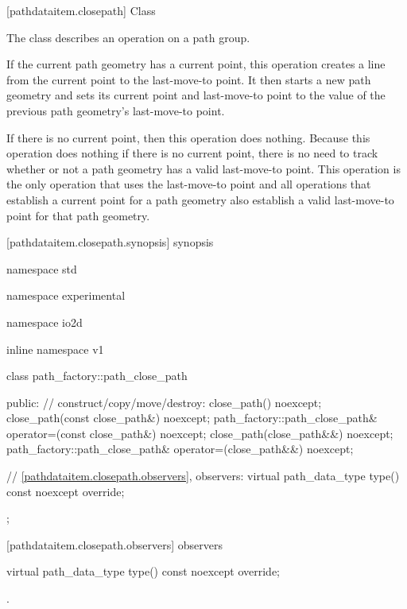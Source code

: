  [pathdataitem.closepath] {Class }

\pnum
{}
The class  describes an operation on a path group.

\pnum
If the current path geometry has a current point, this operation creates a line from the current point to the last-move-to point. It then starts a new path geometry and sets its current point and last-move-to point to the value of the previous path geometry's last-move-to point.

\pnum
If there is no current point, then this operation does nothing.
\enternote
Because this operation does nothing if there is no current point, there is no need to track whether or not a path geometry has a valid last-move-to point. This operation is the only operation that uses the last-move-to point and all operations that establish a current point for a path geometry also establish a valid last-move-to point for that path geometry.
\exitnote

 [pathdataitem.closepath.synopsis] { synopsis}

\begin{codeblock}
namespace std { namespace experimental { namespace io2d { inline namespace v1 {
  class path_factory::path_close_path {
  public:
    // construct/copy/move/destroy:
    close_path() noexcept;
    close_path(const close_path&) noexcept;
    path_factory::path_close_path& operator=(const close_path&) noexcept;
    close_path(close_path&&) noexcept;
    path_factory::path_close_path& operator=(close_path&&) noexcept;

    // \ref{pathdataitem.closepath.observers}, observers:
    virtual path_data_type type() const noexcept override;
  };
} } } }
\end{codeblock}

 [pathdataitem.closepath.observers]{ observers}

\begin{itemdecl}
    virtual path_data_type type() const noexcept override;
\end{itemdecl}
\begin{itemdescr}
	\pnum
	\returns
	.
\end{itemdescr}
